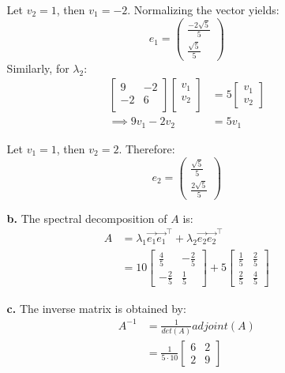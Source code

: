 \documentclass[oneside,12pt,letterpaper]{article}
\begin{document}
\begin{enumerate}
\begin{enumerate}
					Let $v_{2} = 1$, then $v_{1} = -2$. Normalizing the vector yields: $$e_{1} = \begin{pmatrix} \frac{-2 \sqrt{5}}{5} \\ \frac{\sqrt{5}}{5} \end{pmatrix}$$ Similarly, for $\lambda_{2}$:
					\begin{align*}
						\begin{bmatrix} 9 & -2 \\ -2 & 6 \\ \end{bmatrix} \begin{bmatrix}	v_{1} \\ v_{2} \\\end{bmatrix} &= 5 \begin{bmatrix}v_{1} \\ v_{2} \end{bmatrix} \\
						\implies 9 v_{1} -2 v_{2} &= 5 v_{1}
					\end{align*}

				Let $v_{1}=1$, then $v_{2}=2$. Therefore: $$e_{2} = \begin{pmatrix} \frac{\sqrt{5}}{5} \\ \frac{2 \sqrt{5}}{5} \end{pmatrix}$$
			
				\item[\textbf{b.}]
					The spectral decomposition of $A$ is:
					\begin{align*}
					A &= \lambda_{1} \vec{e_{1}} \vec{e_{1}}^\intercal + \lambda_{2} \vec{e_{2}} \vec{e_{2}}^\intercal \\
					  &= 10 \begin{bmatrix} \frac{4}{5} & -\frac{2}{5} \\ -\frac{2}{5} & \frac{1}{5} \end{bmatrix} + 5 \begin{bmatrix} \frac{1}{5} & \frac{2}{5} \\ \frac{2}{5} & \frac{4}{5} \end{bmatrix}
					\end{align*}

				\item[\textbf{c.}]
					The inverse matrix is obtained by: 
					\begin{align*}
						A^{-1} &= \frac{1}{det(A)} adjoint(A) \\
									 &= \frac{1}{5 \cdot 10} \begin{bmatrix} 6 & 2 \\ 2 & 9 \end{bmatrix}
					\end{align*}


\end{enumerate}
\end{enumerate}
\end{document}
